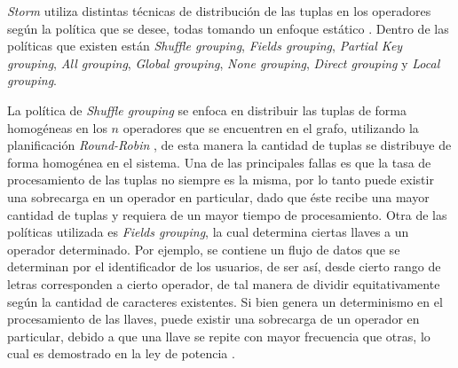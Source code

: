 
\textsl{Storm} utiliza distintas técnicas de distribución de las tuplas en los operadores según la política que se desee, todas tomando un enfoque estático \citep{stormtwitter}. Dentro de las políticas que existen están \textit{Shuffle grouping}, \textit{Fields grouping}, \textit{Partial Key grouping}, \textit{All grouping}, \textit{Global grouping}, \textit{None grouping}, \textit{Direct grouping} y \textit{Local grouping}.

La política de \textit{Shuffle grouping} se enfoca en distribuir las tuplas de forma homogéneas en los $n$ operadores que se encuentren en el grafo, utilizando la planificación \textit{Round-Robin} \citep{bookScheduling}, de esta manera la cantidad de tuplas se distribuye de forma homogénea en el sistema. Una de las principales fallas es que la tasa de procesamiento de las tuplas no siempre es la misma, por lo tanto puede existir una sobrecarga en un operador en particular, dado que éste recibe una mayor cantidad de tuplas y requiera de un mayor tiempo de procesamiento. Otra de las políticas utilizada es \textit{Fields grouping}, la cual determina ciertas llaves a un operador determinado. Por ejemplo, se contiene un flujo de datos que se determinan por el identificador de los usuarios, de ser así, desde cierto rango de letras corresponden a cierto operador, de tal manera de dividir equitativamente según la cantidad de caracteres existentes. Si bien genera un determinismo en el procesamiento de las llaves, puede existir una sobrecarga de un operador en particular, debido a que una llave se repite con mayor frecuencia que otras, lo cual es demostrado en la ley de potencia \citep{rushton2010handbook}.


